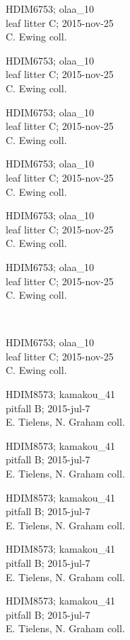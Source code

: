 \documentclass[2pt]{extarticle}
\begin{document}
\noindent
\raggedright
\parbox{0.16\textwidth}{\tiny \raggedright \rule[-0.3\baselineskip]{0pt}{10pt}HDIM6753; olaa\_10\\ leaf litter C; 2015-nov-25\\ C. Ewing coll.}
\parbox{0.16\textwidth}{\tiny \raggedright \rule[-0.3\baselineskip]{0pt}{10pt}HDIM6753; olaa\_10\\ leaf litter C; 2015-nov-25\\ C. Ewing coll.}
\parbox{0.16\textwidth}{\tiny \raggedright \rule[-0.3\baselineskip]{0pt}{10pt}HDIM6753; olaa\_10\\ leaf litter C; 2015-nov-25\\ C. Ewing coll.}
\parbox{0.16\textwidth}{\tiny \raggedright \rule[-0.3\baselineskip]{0pt}{10pt}HDIM6753; olaa\_10\\ leaf litter C; 2015-nov-25\\ C. Ewing coll.}
\parbox{0.16\textwidth}{\tiny \raggedright \rule[-0.3\baselineskip]{0pt}{10pt}HDIM6753; olaa\_10\\ leaf litter C; 2015-nov-25\\ C. Ewing coll.}
\parbox{0.16\textwidth}{\tiny \raggedright \rule[-0.3\baselineskip]{0pt}{10pt}HDIM6753; olaa\_10\\ leaf litter C; 2015-nov-25\\ C. Ewing coll.} \\ 
\vspace{0.001in} 

\noindent
\parbox{0.16\textwidth}{\tiny \raggedright \rule[-0.3\baselineskip]{0pt}{10pt}HDIM6753; olaa\_10\\ leaf litter C; 2015-nov-25\\ C. Ewing coll.}
\parbox{0.16\textwidth}{\tiny \raggedright \rule[-0.3\baselineskip]{0pt}{10pt}HDIM8573; kamakou\_41\\ pitfall B; 2015-jul-7\\ E. Tielens, N. Graham coll.}
\parbox{0.16\textwidth}{\tiny \raggedright \rule[-0.3\baselineskip]{0pt}{10pt}HDIM8573; kamakou\_41\\ pitfall B; 2015-jul-7\\ E. Tielens, N. Graham coll.}
\parbox{0.16\textwidth}{\tiny \raggedright \rule[-0.3\baselineskip]{0pt}{10pt}HDIM8573; kamakou\_41\\ pitfall B; 2015-jul-7\\ E. Tielens, N. Graham coll.}
\parbox{0.16\textwidth}{\tiny \raggedright \rule[-0.3\baselineskip]{0pt}{10pt}HDIM8573; kamakou\_41\\ pitfall B; 2015-jul-7\\ E. Tielens, N. Graham coll.}
\parbox{0.16\textwidth}{\tiny \raggedright \rule[-0.3\baselineskip]{0pt}{10pt}HDIM8573; kamakou\_41\\ pitfall B; 2015-jul-7\\ E. Tielens, N. Graham coll.} \\ 
\vspace{0.001in} 
\end{document}
